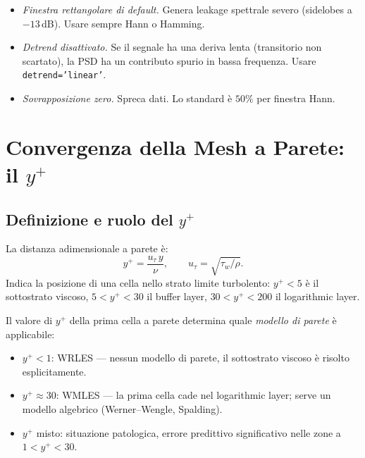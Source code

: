 \documentclass[11pt,a4paper]{article}
\begin{document}
\begin{warnbox}
\begin{itemize}
  \item \emph{Finestra rettangolare di default.} Genera leakage
    spettrale severo (sidelobes a $-13$\,dB). Usare sempre Hann o
    Hamming.
  \item \emph{Detrend disattivato.} Se il segnale ha una deriva lenta
    (transitorio non scartato), la PSD ha un contributo spurio in
    bassa frequenza. Usare \texttt{detrend='linear'}.
  \item \emph{Sovrapposizione zero.} Spreca dati. Lo standard è $50\%$
    per finestra Hann.
\end{itemize}
\end{warnbox}

\section{Convergenza della Mesh a Parete: il $y^+$}
\label{sec:meshquality}

\subsection{Definizione e ruolo del $y^+$}

La distanza adimensionale a parete è:
\begin{equation}
  y^+ = \frac{u_\tau\,y}{\nu},
  \qquad u_\tau = \sqrt{\tau_w/\rho}.
\end{equation}
Indica la posizione di una cella nello strato limite turbolento:
$y^+ < 5$ è il sottostrato viscoso, $5 < y^+ < 30$ il buffer layer,
$30 < y^+ < 200$ il logarithmic layer.

Il valore di $y^+$ della prima cella a parete determina quale
\emph{modello di parete} è applicabile:
\begin{itemize}
  \item $y^+ < 1$: WRLES — nessun modello di parete, il sottostrato
    viscoso è risolto esplicitamente.
  \item $y^+ \approx 30$: WMLES — la prima cella cade nel logarithmic
    layer; serve un modello algebrico (Werner--Wengle, Spalding).
  \item $y^+$ misto: situazione patologica, errore predittivo
    significativo nelle zone a $1 < y^+ < 30$.
\end{itemize}
\end{document}
